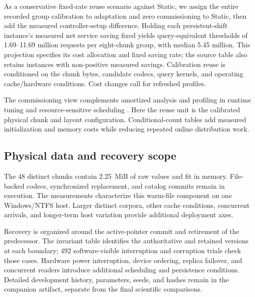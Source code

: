 As a conservative fixed-rate reuse scenario against Static, we assign the entire recorded group calibration to adaptation and zero commissioning to Static, then add the measured controller-setup difference. Holding each persistent-shift instance's measured net service saving fixed yields query-equivalent thresholds of 1.69--11.69 million requests per eight-chunk group, with median 5.45 million. This projection specifies its cost allocation and fixed saving rate; the source table also retains instances with non-positive measured savings. Calibration reuse is conditioned on the chunk bytes, candidate codecs, query kernels, and operating cache/hardware conditions. Cost changes call for refreshed profiles.

The commissioning view complements amortized analysis and profiling in runtime tuning and resource-sensitive scheduling \citep{alvarez2027online,wu2027sensascale}. Here the reuse unit is the calibrated physical chunk and layout configuration. Conditional-count tables add measured initialization and memory costs while reducing repeated online distribution work.

\subsection{Physical data and recovery scope}
The 48 distinct chunks contain 2.25~MiB of raw values and fit in memory. File-backed codecs, synchronized replacement, and catalog commits remain in execution. The measurements characterize this warm-file component on one Windows/NTFS host. Larger distinct corpora, other cache conditions, concurrent arrivals, and longer-term host variation provide additional deployment axes.

Recovery is organized around the active-pointer commit and retirement of the predecessor. The invariant table identifies the authoritative and retained versions at each boundary; 492 software-visible interruption and corruption trials check those cases. Hardware power interruption, device ordering, replica failover, and concurrent readers introduce additional scheduling and persistence conditions. Detailed development history, parameters, seeds, and hashes remain in the companion artifact, separate from the final scientific comparisons.
